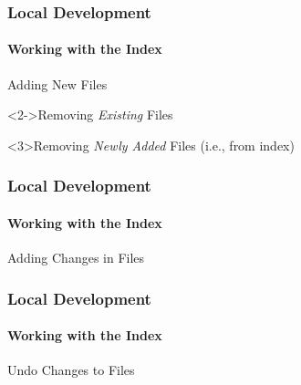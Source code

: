 \begin{frame}[fragile]
 \frametitle{Local Development}
 \framesubtitle{Working with the Index}

 \begin{exampleblock}{Adding New Files}
  \begin{semiverbatim}
\end{semiverbatim}
 \end{exampleblock}

 \begin{exampleblock}<2->{Removing \textit{Existing} Files}
  \begin{semiverbatim}
\end{semiverbatim}
 \end{exampleblock}

 \begin{exampleblock}<3>{Removing \textit{Newly Added} Files (i.e., from index)}
  \begin{semiverbatim}
\end{semiverbatim}
 \end{exampleblock}
\end{frame}

\begin{frame}[fragile]
 \frametitle{Local Development}
 \framesubtitle{Working with the Index}

 \begin{exampleblock}{Adding Changes in Files}
  \begin{semiverbatim}
 
\pause
{}
\pause
{}
\end{semiverbatim}
 \end{exampleblock}
\end{frame}

\begin{frame}[fragile]
 \frametitle{Local Development}
 \framesubtitle{Working with the Index}

 \begin{exampleblock}{Undo Changes to Files}
  \begin{semiverbatim}
\pause
{}
\pause\pause
{}
\end{semiverbatim}
 \end{exampleblock}
\end{frame}

